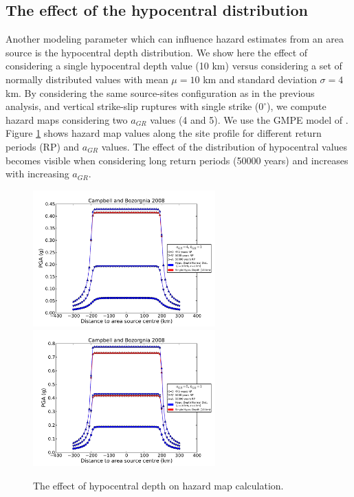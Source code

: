 \subsection{The effect of the hypocentral distribution}
Another modeling parameter which can influence hazard estimates from an area source is the hypocentral
depth distribution. We show here the effect of considering a single hypocentral depth value (10 km) versus
considering a set of normally distributed values with mean $\mu=10$ km and standard deviation $\sigma=4$ km. By considering the same source-sites configuration as in the previous analysis, and vertical
strike-slip ruptures with single strike ($0^{\circ}$), we compute hazard maps considering two $a_{GR}$ values (4 and 5). We use the GMPE model of \cite{campbell2008}. Figure \ref{fig:hypo_depth_area} shows hazard map values along the site profile for different
return periods (RP) and $a_{GR}$ values. The effect of the distribution of hypocentral values becomes visible when considering long return periods (50000 years) and increases with increasing $a_{GR}$.
\begin{figure}
\centering
\includegraphics[width=7cm]{./Pictures/PGA_a4_CB2008_hypo_depth.pdf}
\includegraphics[width=7cm]{./Pictures/PGA_a5_CB2008_hypo_depth.pdf}
\caption{The effect of hypocentral depth on hazard map calculation.}
\label{fig:hypo_depth_area}
\end{figure}


